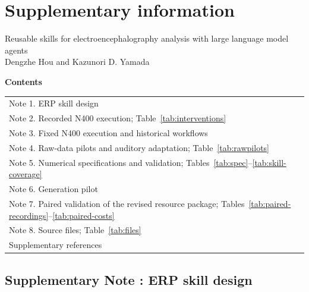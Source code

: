 
\clearpage
\appendix
\setcounter{page}{1}
\renewcommand{\thepage}{S\arabic{page}}
\setcounter{figure}{0}
\renewcommand{\thefigure}{S\arabic{figure}}
\renewcommand{\theHfigure}{S\arabic{figure}}
\section*{Supplementary information}
\begin{center}
\large Reusable skills for electroencephalography analysis with large language model agents\\[4pt]
\normalsize Dengzhe Hou and Kazunori D. Yamada
\end{center}
\makeatletter
\setlength{\@fptop}{0pt}
\makeatother
\renewcommand{\topfraction}{0.95}
\renewcommand{\textfraction}{0.05}
\renewcommand{\thetable}{S\arabic{table}}
\setcounter{table}{0}
\noindent\textbf{Contents}\par\smallskip
\begin{tabular}{@{}p{13.0cm}r@{}}
Note 1. ERP skill design & \pageref*{si:skills} \\
Note 2. Recorded N400 execution; Table~\ref*{tab:interventions} & \pageref*{si:recorded} \\
Note 3. Fixed N400 execution and historical workflows & \pageref*{si:workflows} \\
Note 4. Raw-data pilots and auditory adaptation; Table~\ref*{tab:rawpilots} & \pageref*{si:pilots} \\
Note 5. Numerical specifications and validation; Tables~\ref*{tab:spec}--\ref*{tab:skill-coverage} & \pageref*{si:numerical} \\
Note 6. Generation pilot & \pageref*{si:generation} \\
Note 7. Paired validation of the revised resource package; Tables~\ref*{tab:paired-recordings}--\ref*{tab:paired-costs} & \pageref*{si:paired-validation} \\
Note 8. Source files; Table~\ref*{tab:files} & \pageref*{si:sources} \\
Supplementary references & \pageref*{si:references} \\
\end{tabular}

\FloatBarrier
{}
\subsection*{Supplementary Note \thesuppnote: ERP skill design}
\label{si:skills}

